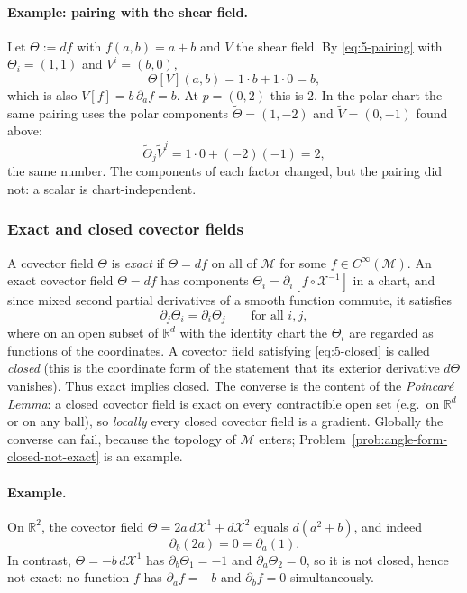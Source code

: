 \documentclass[11pt]{article}
\newcommand{\Cinf}{C^\infty(\mathcal M)}
\begin{document}
\paragraph{Example: pairing with the shear field.} Let $\Theta:=df$ with $f(a,b)=a+b$ and $V$ the shear field. By \eqref{eq:5-pairing} with $\Theta_i=(1,1)$ and $V^i=(b,0)$,
\[
\Theta[V](a,b)=1\cdot b+1\cdot0=b,
\]
which is also $V[f]=b\,\partial_af=b$. At $p=(0,2)$ this is $2$. In the polar chart the same pairing uses the polar components $\widetilde\Theta=(1,-2)$ and $\widetilde V=(0,-1)$ found above:
\[
\widetilde\Theta_j\widetilde V^j=1\cdot0+(-2)(-1)=2,
\]
the same number. The components of each factor changed, but the pairing did not: a scalar is chart-independent.

\subsubsection*{Exact and closed covector fields}
A covector field $\Theta$ is \emph{exact} if $\Theta=df$ on all of $\mathcal M$ for some $f\in\Cinf$. An exact covector field $\Theta=df$ has components $\Theta_i=\partial_i[f\circ\mathcal X^{-1}]$ in a chart, and since mixed second partial derivatives of a smooth function commute, it satisfies
\begin{equation}
\partial_j\Theta_i=\partial_i\Theta_j\qquad\text{for all }i,j,
\tag{5.5}\label{eq:5-closed}
\end{equation}
where on an open subset of $\mathbb R^d$ with the identity chart the $\Theta_i$ are regarded as functions of the coordinates. A covector field satisfying \eqref{eq:5-closed} is called \emph{closed} (this is the coordinate form of the statement that its exterior derivative $d\Theta$ vanishes). Thus exact implies closed. The converse is the content of the \emph{Poincar\'e Lemma}: a closed covector field is exact on every contractible open set (e.g.\ on $\mathbb R^d$ or on any ball), so \emph{locally} every closed covector field is a gradient. Globally the converse can fail, because the topology of $\mathcal M$ enters; Problem~\ref{prob:angle-form-closed-not-exact} is an example.

\paragraph{Example.} On $\mathbb R^2$, the covector field $\Theta=2a\,d\mathcal X^1+d\mathcal X^2$ equals $d(a^2+b)$, and indeed
\[
\partial_b(2a)=0=\partial_a(1).
\]
In contrast, $\Theta=-b\,d\mathcal X^1$ has $\partial_b\Theta_1=-1$ and $\partial_a\Theta_2=0$, so it is not closed, hence not exact: no function $f$ has $\partial_af=-b$ and $\partial_bf=0$ simultaneously.
\end{document}
